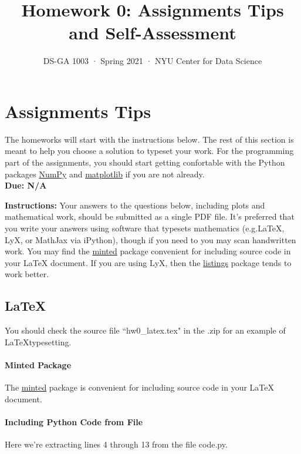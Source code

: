 \documentclass[12pt]{article}
\date{}
\begin{document}
 

\title{Homework 0: Assignments Tips and Self-Assessment}
\author{
DS-GA 1003 · Spring 2021 · NYU Center for Data Science}

\maketitle

\section{Assignments Tips}

The homeworks will start with the instructions below. The rest of this section is meant to help you choose a solution to typeset your work. For the programming part of the assignments, you should start getting confortable with the Python packages \href{https://numpy.org/}{NumPy} and \href{https://matplotlib.org/}{matplotlib} if you are not already.
\\

\textbf{Due: N/A}

\textbf{Instructions: }Your answers to the questions below, including plots and mathematical
 work, should be submitted as a single PDF file.  It's preferred that you write your answers using software that typesets mathematics (e.g.LaTeX, LyX, or MathJax via iPython), though if you need to you may scan handwritten work.  You may find the \href{https://github.com/gpoore/minted}{minted} package convenient for including source code in your LaTeX document.  If you are using LyX, then the \href{https://en.wikibooks.org/wiki/LaTeX/Source_Code_Listings}{listings} package tends to work better.

\subsection{\LaTeX}
You should check the source file ``hw0\_latex.tex" in the .zip for an example of \LaTeX typesetting.

\paragraph{Minted Package}
The \href{https://github.com/gpoore/minted}{minted} package is convenient for including source code in your LaTeX document.

\paragraph{Including Python Code from File}
Here we're extracting lines 4 through 13 from the file code.py.
\inputminted[firstline=4, lastline=13, breaklines=True]{python}{code.py}
\end{document}
